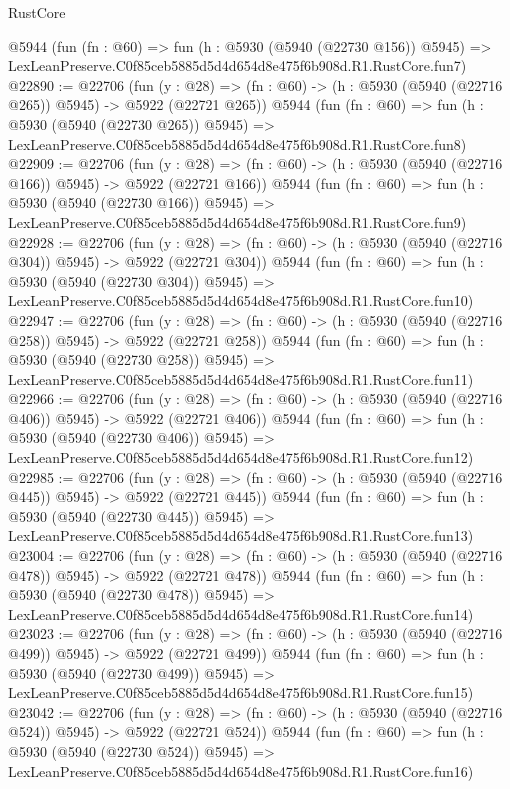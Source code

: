\begin{lexlean}{RustCore}
\begin{coremodule}
    @5944
    (fun (fn : @60) =>
    fun (h : @5930 (@5940 (@22730 @156)) @5945) =>
    LexLeanPreserve.C0f85ceb5885d5d4d654d8e475f6b908d.R1.RustCore.fun7)
@22890 := @22706
    (fun (y : @28) => (fn : @60) -> (h : @5930 (@5940 (@22716 @265)) @5945) -> @5922 (@22721 @265))
    @5944
    (fun (fn : @60) =>
    fun (h : @5930 (@5940 (@22730 @265)) @5945) =>
    LexLeanPreserve.C0f85ceb5885d5d4d654d8e475f6b908d.R1.RustCore.fun8)
@22909 := @22706
    (fun (y : @28) => (fn : @60) -> (h : @5930 (@5940 (@22716 @166)) @5945) -> @5922 (@22721 @166))
    @5944
    (fun (fn : @60) =>
    fun (h : @5930 (@5940 (@22730 @166)) @5945) =>
    LexLeanPreserve.C0f85ceb5885d5d4d654d8e475f6b908d.R1.RustCore.fun9)
@22928 := @22706
    (fun (y : @28) => (fn : @60) -> (h : @5930 (@5940 (@22716 @304)) @5945) -> @5922 (@22721 @304))
    @5944
    (fun (fn : @60) =>
    fun (h : @5930 (@5940 (@22730 @304)) @5945) =>
    LexLeanPreserve.C0f85ceb5885d5d4d654d8e475f6b908d.R1.RustCore.fun10)
@22947 := @22706
    (fun (y : @28) => (fn : @60) -> (h : @5930 (@5940 (@22716 @258)) @5945) -> @5922 (@22721 @258))
    @5944
    (fun (fn : @60) =>
    fun (h : @5930 (@5940 (@22730 @258)) @5945) =>
    LexLeanPreserve.C0f85ceb5885d5d4d654d8e475f6b908d.R1.RustCore.fun11)
@22966 := @22706
    (fun (y : @28) => (fn : @60) -> (h : @5930 (@5940 (@22716 @406)) @5945) -> @5922 (@22721 @406))
    @5944
    (fun (fn : @60) =>
    fun (h : @5930 (@5940 (@22730 @406)) @5945) =>
    LexLeanPreserve.C0f85ceb5885d5d4d654d8e475f6b908d.R1.RustCore.fun12)
@22985 := @22706
    (fun (y : @28) => (fn : @60) -> (h : @5930 (@5940 (@22716 @445)) @5945) -> @5922 (@22721 @445))
    @5944
    (fun (fn : @60) =>
    fun (h : @5930 (@5940 (@22730 @445)) @5945) =>
    LexLeanPreserve.C0f85ceb5885d5d4d654d8e475f6b908d.R1.RustCore.fun13)
@23004 := @22706
    (fun (y : @28) => (fn : @60) -> (h : @5930 (@5940 (@22716 @478)) @5945) -> @5922 (@22721 @478))
    @5944
    (fun (fn : @60) =>
    fun (h : @5930 (@5940 (@22730 @478)) @5945) =>
    LexLeanPreserve.C0f85ceb5885d5d4d654d8e475f6b908d.R1.RustCore.fun14)
@23023 := @22706
    (fun (y : @28) => (fn : @60) -> (h : @5930 (@5940 (@22716 @499)) @5945) -> @5922 (@22721 @499))
    @5944
    (fun (fn : @60) =>
    fun (h : @5930 (@5940 (@22730 @499)) @5945) =>
    LexLeanPreserve.C0f85ceb5885d5d4d654d8e475f6b908d.R1.RustCore.fun15)
@23042 := @22706
    (fun (y : @28) => (fn : @60) -> (h : @5930 (@5940 (@22716 @524)) @5945) -> @5922 (@22721 @524))
    @5944
    (fun (fn : @60) =>
    fun (h : @5930 (@5940 (@22730 @524)) @5945) =>
    LexLeanPreserve.C0f85ceb5885d5d4d654d8e475f6b908d.R1.RustCore.fun16)

\end{coremodule}
\end{lexlean}
